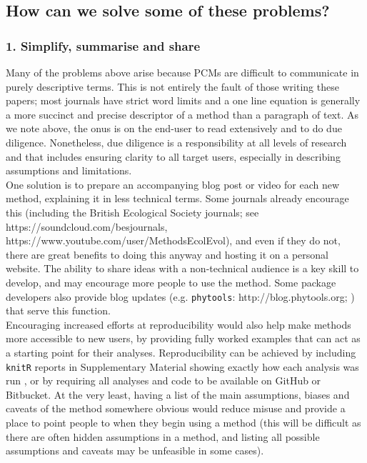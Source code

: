 \documentclass[a4paper,12pt]{article}
\begin{document}
\subsection{How can we solve some of these problems?}
  \subsubsection{1. Simplify, summarise and share}
    Many of the problems above arise because PCMs are difficult to communicate in purely descriptive terms.
    This is not entirely the fault of those writing these papers; most journals have strict word limits and a one line equation is generally a more succinct and precise descriptor of a method than a paragraph of text. 
    As we note above, the onus is on the end-user to read extensively and to do due diligence.
    Nonetheless, due diligence is a responsibility at all levels of research and that includes ensuring clarity to all target users, especially in describing assumptions and limitations.\\

    One solution is to prepare an accompanying blog post or video for each new method, explaining it in less technical terms. 
    Some journals already encourage this (including the British Ecological Society journals; see https://soundcloud.com/besjournals, https://www.youtube.com/user/MethodsEcolEvol), and even if they do not, there are great benefits to doing this anyway and hosting it on a personal website. 
    The ability to share ideas with a non-technical audience is a key skill to develop, and may encourage more people to use the method.
    Some package developers also provide blog updates (e.g. \texttt{phytools}: http://blog.phytools.org; \citealp{revell2012phytools}) that serve this function. \\

    Encouraging increased efforts at reproducibility would also help make methods more accessible to new users, by providing fully worked examples that can act as a starting point for their analyses.
    Reproducibility can be achieved by including \texttt{knitR} \citep{Xie:2015aa} reports in Supplementary Material showing exactly how each analysis was run \citep[e.g.][]{fitzjohn2014much}, or by requiring all analyses and code to be available on GitHub or Bitbucket. 
    At the very least, having a list of the main assumptions, biases and caveats of the method somewhere obvious would reduce misuse and provide a place to point people to when they begin using a method (this will be difficult as there are often hidden assumptions in a method, and listing all possible assumptions and caveats may be unfeasible in some cases).\\
\end{document}

